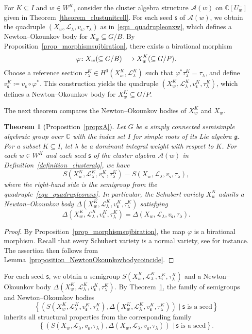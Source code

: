 \documentclass[11pt]{amsart}
\newcommand{\C}{\mathbb{C}}
\def\mcal{\mathcal}
\def\frak{\mathfrak}
\numberwithin{equation}{section}
\theoremstyle{plain}
\newtheorem{theorem}{Theorem}[section]
\theoremstyle{definition}
\def\to{\mathchoice{\longrightarrow}{\rightarrow}{\rightarrow}{\rightarrow}}
\numberwithin{equation}{section}
\newcommand{\seed}{\mathsf{s}}
\begin{document}
For $K \subseteq I$ and $w \in W^K$, consider the cluster algebra structure $\mcal{A}(w)$ on $\C[U^-_w]$ given in Theorem~\ref{theorem_clustunitcell}. For each seed $\seed$ of $\mcal{A}(w)$, we obtain the quadruple $(X_w, \mcal{L}_\lambda, v_\seed, \tau_\lambda)$ as in~\eqref{equ_quadrupleonxw}, which defines a Newton--Okounkov body for $X_w \subseteq G/B$. By Proposition~\ref{prop_morphismsujbiration}, there exists a birational morphism
$$
\varphi \colon X_w (\subseteq G/B) \to X_w^K (\subseteq G/P).
$$
Choose a reference section $\tau^K_\lambda \in H^0(X_w^K, \mcal{L}^K_\lambda)$ such that $\varphi^* \tau^K_\lambda = \tau_\lambda$, and define $v_\seed^K \coloneqq v_\seed \circ \varphi^*$. This construction yields the quadruple $(X_w^K, \mcal{L}^K_\lambda, v^K_\seed, \tau^K_\lambda)$, which defines a Newton--Okounkov body for $X_w^K \subseteq G/P$. 

The next theorem compares the Newton--Okounkov bodies of $X_w^K$ and $X_w$. 

\begin{theorem}[Proposition~\ref{propxA}]\label{theorem_NOpolyopteforXWK}
Let $G$ be a simply connected semisimple algebraic group over $\C$ with the index set $I$ for simple roots of its Lie algebra $\frak{g}$. For a subset $K \subseteq I$, let $\lambda$ be a dominant integral weight with respect to $K$. For each $w \in W^K$ and each seed $\seed$ of the cluster algebra $\mcal{A}(w)$ in Definition~\ref{definition_clusteralg}, we have 
$$
S(X_w^K, \mcal{L}^K_\lambda, v^K_\seed, \tau^K_\lambda) =  S(X_w, \mcal{L}_\lambda, v_\seed, \tau_\lambda),
$$
where the right-hand side is the semigroup from the quadruple~\eqref{equ_quadrupleonxw}.
In particular, the Schubert variety $X_w^K$ admits a Newton--Okounkov body $\Delta(X_w^K, \mcal{L}^K_\lambda, v^K_\seed, \tau^K_\lambda)$ satisfying 
$$
\Delta(X_w^K, \mcal{L}^K_\lambda, v^K_\seed, \tau^K_\lambda) =  \Delta(X_w, \mcal{L}_\lambda, v_\seed, \tau_\lambda).
$$
\end{theorem}

\begin{proof}
By Proposition~\ref{prop_morphismsujbiration}, the map $\varphi$ is a birational morphism. Recall that every Schubert variety is a normal variety, see \cite[Theorem 2.1.1]{Bri04} for instance. The assertion then follows from Lemma~\ref{proposition_NewtonOkounkovbodycoincide}.
\end{proof}

For each seed $\seed$, we obtain a semigroup $S(X_w^K, \mcal{L}^K_\lambda, v^K_{\seed}, \tau^K_\lambda)$ and a Newton--Okounkov body $\Delta(X_w^K, \mcal{L}^K_\lambda, v^K_{\seed}, \tau^K_\lambda)$. By Theorem~\ref{theorem_NOpolyopteforXWK}, the family of semigroups and Newton--Okounkov bodies 
\begin{equation}\label{equ_familyofnewtonxwk}
\left\{ \left( S(X_w^K, \mcal{L}^K_\lambda, v^K_{\seed}, \tau^K_\lambda), \Delta(X_w^K, \mcal{L}^K_\lambda, v^K_{\seed}, \tau^K_\lambda) \right) \mid \mbox{$\seed$ is a seed} \right\}
\end{equation}
inherits all structural properties from the corresponding family $$
\left\{ \left( S(X_w, \mcal{L}_\lambda, v_\seed, \tau_\lambda), \Delta(X_w, \mcal{L}_\lambda, v_\seed, \tau_\lambda) \right) \mid \mbox{$\seed$ is a seed}  \right\}.
$$
\end{document}
